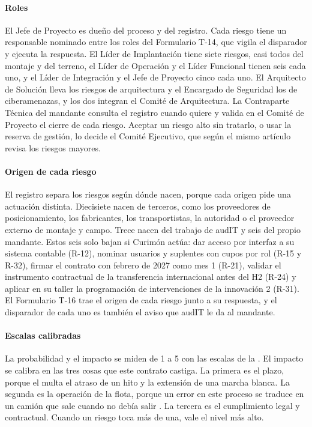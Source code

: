 \paragraph{Roles}
El Jefe de Proyecto es dueño del proceso y del registro. Cada riesgo tiene un responsable nominado entre
los roles del Formulario T-14, que vigila el disparador y ejecuta la respuesta. El Líder de Implantación
tiene siete riesgos, casi todos del montaje y del terreno, el Líder de Operación y el Líder Funcional
tienen seis cada uno, y el Líder de Integración y el Jefe de Proyecto cinco cada uno. El Arquitecto de Solución lleva los riesgos de arquitectura
y el Encargado de Seguridad los de ciberamenazas, y los dos integran el Comité de Arquitectura. La
Contraparte Técnica del mandante consulta el registro cuando quiere y valida en el Comité de Proyecto el
cierre de cada riesgo. Aceptar un riesgo alto sin tratarlo, o usar la reserva de gestión, lo decide el
Comité Ejecutivo, que según el mismo artículo revisa los riesgos mayores.

\paragraph{Origen de cada riesgo}
El registro separa los riesgos según dónde nacen, porque cada origen pide una actuación distinta.
Diecisiete nacen de terceros, como los proveedores de posicionamiento, los fabricantes, los transportistas,
la autoridad o el proveedor externo de montaje y campo. Trece nacen del trabajo de audIT y seis del propio mandante. Estos seis solo bajan si
Curimón actúa: dar acceso por interfaz a su sistema contable (R-12), nominar usuarios y suplentes con
cupos por rol (R-15 y R-32), firmar el contrato con febrero de 2027 como mes 1 (R-21), validar el
instrumento contractual de la transferencia internacional antes del H2 (R-24) y aplicar en su taller la programación de
intervenciones de la innovación 2 (R-31). El Formulario T-16 trae el origen de cada riesgo junto a su
respuesta, y el disparador de cada uno es también el aviso que audIT le da al mandante.

\paragraph{Escalas calibradas}
La probabilidad y el impacto se miden de 1 a 5 con las escalas de la . El impacto se
calibra en las tres cosas que este contrato castiga. La primera es el plazo, porque el  multa
el atraso de un hito y la extensión de una marcha blanca. La segunda es la operación de la flota, porque
un error en este proceso se traduce en un camión que sale cuando no debía salir
. La tercera es el cumplimiento legal y contractual. Cuando un riesgo toca más de
una, vale el nivel más alto.

